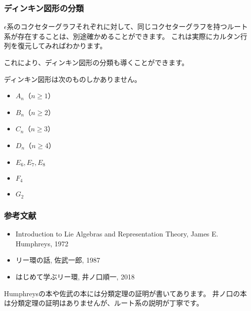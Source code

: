 \documentclass{beamer}
\begin{document}
\begin{frame}
    \frametitle{ディンキン図形の分類}

    $ϵ$系のコクセターグラフそれぞれに対して、同じコクセターグラフを持つルート系が存在することは、別途確かめることができます。
    これは実際にカルタン行列を復元してみればわかります。

    これにより、ディンキン図形の分類も導くことができます。

    \begin{theorem}
        ディンキン図形は次のものしかありません。
        \begin{itemize}
            \item $A_n$（$n≥1$）
            \item $B_n$（$n≥2$）
            \item $C_n$（$n≥3$）
            \item $D_n$（$n≥4$）
            \item $E_6,E_7,E_8$
            \item $F_4$
            \item $G_2$
        \end{itemize}
    \end{theorem}
\end{frame}

\begin{frame}
    \frametitle{参考文献}

    \begin{itemize}
        \item Introduction to Lie Algebras and Representation Theory, James E. Humphreys, 1972
        \item リー環の話, 佐武一郎, 1987
        \item はじめて学ぶリー環, 井ノ口順一, 2018
    \end{itemize}

    Humphreysの本や佐武の本には分類定理の証明が書いてあります。
    井ノ口の本は分類定理の証明はありませんが、ルート系の説明が丁寧です。
\end{frame}
\end{document}
